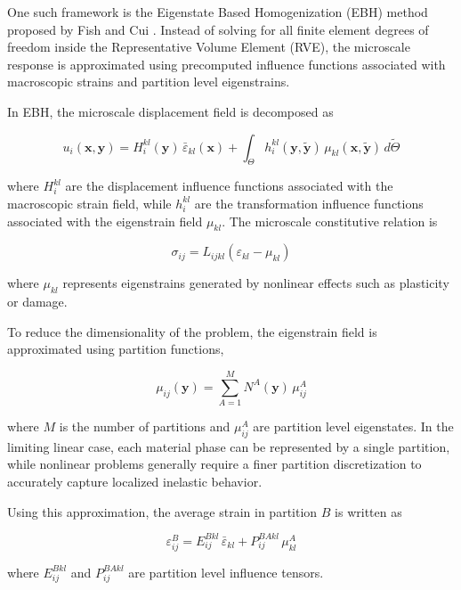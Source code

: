 \documentclass[12pt]{article}
\begin{document}
One such framework is the Eigenstate Based Homogenization (EBH) method proposed by Fish and Cui \cite{FishCuiEBH}. Instead of solving for all finite element degrees of freedom inside the Representative Volume Element (RVE), the microscale response is approximated using precomputed influence functions associated with macroscopic strains and partition level eigenstrains.

In EBH, the microscale displacement field is decomposed as

\begin{equation}
u_i(\mathbf{x},\mathbf{y}) = H_i^{kl}(\mathbf{y})\,\bar{\varepsilon}_{kl}(\mathbf{x}) + \int_{\Theta} h_i^{kl}(\mathbf{y},\tilde{\mathbf{y}}) \,
\mu_{kl}(\mathbf{x},\tilde{\mathbf{y}}) \,d\tilde{\Theta}
\end{equation}

where $H_i^{kl}$ are the displacement influence functions associated with the macroscopic strain field, while $h_i^{kl}$ are the transformation influence functions associated with the eigenstrain field $\mu_{kl}$. The microscale constitutive relation is

\begin{equation}
\sigma_{ij} = L_{ijkl} \left( \varepsilon_{kl}-\mu_{kl}\right)
\end{equation}

where $\mu_{kl}$ represents eigenstrains generated by nonlinear effects such as plasticity or damage.

To reduce the dimensionality of the problem, the eigenstrain field is approximated using partition functions,

\begin{equation}
\mu_{ij}(\mathbf{y}) =\sum_{A=1}^{M}N^A(\mathbf{y})\,\mu^A_{ij}
\end{equation}

where $M$ is the number of partitions and $\mu^A_{ij}$ are partition level eigenstates. In the limiting linear case, each material phase can be represented by a single partition, while nonlinear problems generally require a finer partition discretization to accurately capture localized inelastic behavior.

Using this approximation, the average strain in partition $B$ is written as

\begin{equation}
\varepsilon^{B}_{ij}=E^{Bkl}_{ij}\,\bar{\varepsilon}_{kl}+P^{BAkl}_{ij}\,\mu^A_{kl}
\end{equation}

where $E^{Bkl}_{ij}$ and $P^{BAkl}_{ij}$ are partition level influence tensors.
\end{document}
